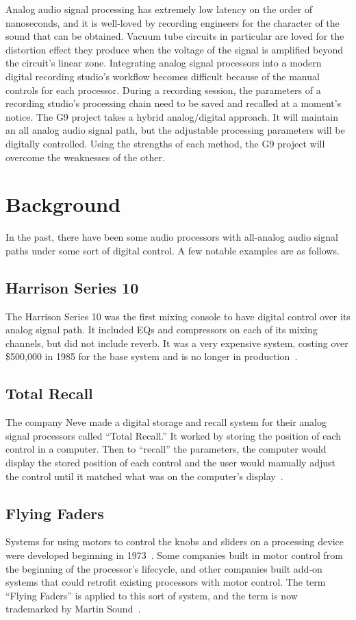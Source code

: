 \documentclass[journal]{IEEEtran}
\begin{document}
	Analog audio signal processing has extremely low latency on the order of nanoseconds, and it is well-loved by recording engineers for the character of the sound that can be obtained. Vacuum tube circuits in particular are loved for the distortion effect they produce when the voltage of the signal is amplified beyond the circuit's linear zone. Integrating analog signal processors into a modern digital recording studio's workflow becomes difficult because of the manual controls for each processor. During a recording session, the parameters of a recording studio's processing chain need to be saved and recalled at a moment's notice. The G9 project takes a hybrid analog/digital approach. It will maintain an all analog audio signal path, but the adjustable processing parameters will be digitally controlled. Using the strengths of each method, the G9 project will overcome the weaknesses of the other.
	
	
	\section{Background}
	In the past, there have been some audio processors with all-analog audio signal paths under some sort of digital control. A few notable examples are as follows.
	
	\subsection{Harrison Series 10}
	The Harrison Series 10 was the first mixing console to have digital control over its analog signal path. It included EQs and compressors on each of its mixing channels, but did not include reverb. It was a very expensive system, costing over \$500,000 in 1985 for the base system and is no longer in production~\cite{harrisonSeries10}.
	
	\subsection{Total Recall}
	The company Neve made a digital storage and recall system for their analog signal processors called ``Total Recall.'' It worked by storing the position of each control in a computer. Then to ``recall'' the parameters, the computer would display the stored position of each control and the user would manually adjust the control until it matched what was on the computer's display~\cite{totalRecall}.
	
	\subsection{Flying Faders \texttrademark}
	Systems for using motors to control the knobs and sliders on a processing device were developed beginning in 1973~\cite{api}.  Some companies built in motor control from the beginning of the processor's lifecycle, and other companies built add-on systems that could retrofit existing processors with motor control. The term ``Flying Faders\texttrademark'' is applied to this sort of system, and the term is now trademarked by Martin Sound~\cite{flyingFaders}.
	
\end{document}
